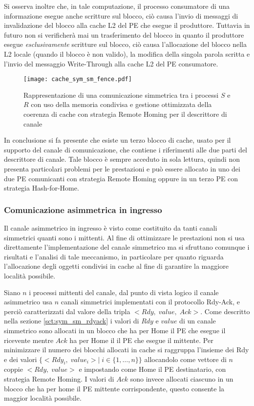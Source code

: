 Si osserva inoltre che, in tale computazione, il processo consumatore di una informazione esegue anche scritture sul blocco, ci\`o causa l'invio di messaggi di invalidazione del blocco alla cache L2 del PE che esegue il produttore. Tuttavia in futuro non si verificher\`a mai un trasferimento del blocco in quanto il produttore esegue \emph{esclusivamente} scritture sul blocco, ci\`o causa l'allocazione del blocco nella L2 locale (quando il blocco \`e non valido), la modifica della singola parola scritta e l'invio del messaggio Write-Through alla cache L2 del PE consumatore.
\FloatBarrier
\begin{figure}[!t]
  \texttt{[image: cache\_sym\_sm\_fence.pdf]}
  \centering
  \caption[Comunicazione simmetrica su memoria condivisa]{Rappresentazione di una comunicazione simmetrica tra i processi $S$ e $R$ con uso della memoria condivisa e gestione ottimizzata della coerenza di cache con strategia Remote Homing per il descrittore di canale}
  \label{fig:cache_sym_sm_fence}
\end{figure}

In conclusione si fa presente che esiste un terzo blocco di cache, usato per il supporto del canale di comunicazione, che contiene i riferimenti alle due parti del descrittore di canale. Tale blocco \`e sempre acceduto in sola lettura, quindi non presenta particolari problemi per le prestazioni e pu\`o essere allocato in uno dei due PE comunicanti con strategia Remote Homing oppure in un terzo PE con strategia Hash-for-Home.

\newpage

\FloatBarrier
\subsubsection{Comunicazione asimmetrica in ingresso}
\label{sct:asymin_sm_rdyack}
Il canale asimmetrico in ingresso \`e visto come costituito da tanti canali simmetrici quanti sono i mittenti. Al fine di ottimizzare le prestazioni non si usa direttamente l'implementazione del canale simmetrico ma si sfruttano comunque i risultati e l'analisi di tale meccanismo, in particolare per quanto riguarda l'allocazione degli oggetti condivisi in cache al fine di garantire la maggiore localit\`a possibile. 

Siano $n$ i processi mittenti del canale, dal punto di vista logico il canale asimmetrico usa $n$ canali simmetrici implementati con il protocollo Rdy-Ack, e perci\`o caratterizzati dal valore della tripla $<Rdy,\; value,\; Ack>$. Come descritto nella sezione \ref{sct:sym_sm_rdyack} i valori di  $Rdy$ e $value$ di un canale simmetrico sono allocati in un blocco che ha per Home il PE che esegue il ricevente mentre $Ack$ ha per Home il il PE che esegue il mittente. Per minimizzare il numero dei blocchi allocati in cache si raggruppa l'insieme dei Rdy e dei valori $\{ <Rdy_i,\; value_i> |\; i \in \{ 1, \dots, n\} \}$ allocandolo come vettore di $n$ coppie $<Rdy,\;value>$ e impostando come Home il PE destinatario, con strategia Remote Homing. I valori di $Ack$ sono invece allocati ciascuno in un blocco che ha per home il PE mittente corrispondente, questo consente la maggior localit\`a possibile. 

